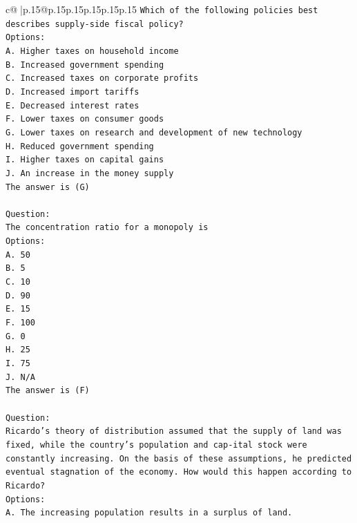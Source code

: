 \documentclass{article}
\begin{document}
{\begin{supertabular}{c@{$\;$}|p{.15\linewidth}@{}p{.15\linewidth}p{.15\linewidth}p{.15\linewidth}p{.15\linewidth}p{.15\linewidth}}
{{{\texttt{Which of the following policies best describes supply{-}side fiscal policy?} \\
\texttt{Options:} \\
\texttt{A. Higher taxes on household income} \\
\texttt{B. Increased government spending} \\
\texttt{C. Increased taxes on corporate profits} \\
\texttt{D. Increased import tariffs} \\
\texttt{E. Decreased interest rates} \\
\texttt{F. Lower taxes on consumer goods} \\
\texttt{G. Lower taxes on research and development of new technology} \\
\texttt{H. Reduced government spending} \\
\texttt{I. Higher taxes on capital gains} \\
\texttt{J. An increase in the money supply} \\
\texttt{The answer is (G)} \\
\\ 
\texttt{Question:} \\
\texttt{The concentration ratio for a monopoly is} \\
\texttt{Options:} \\
\texttt{A. 50} \\
\texttt{B. 5} \\
\texttt{C. 10} \\
\texttt{D. 90} \\
\texttt{E. 15} \\
\texttt{F. 100} \\
\texttt{G. 0} \\
\texttt{H. 25} \\
\texttt{I. 75} \\
\texttt{J. N/A} \\
\texttt{The answer is (F)} \\
\\ 
\texttt{Question:} \\
\texttt{Ricardo's theory of distribution assumed that the supply of land was fixed, while the country's population and cap{-}ital stock were constantly increasing. On the basis of these assumptions, he predicted eventual stagnation of the economy. How would this happen according to Ricardo?} \\
\texttt{Options:} \\
\texttt{A. The increasing population results in a surplus of land.} \\
}}}
\end{supertabular}}
\end{document}
